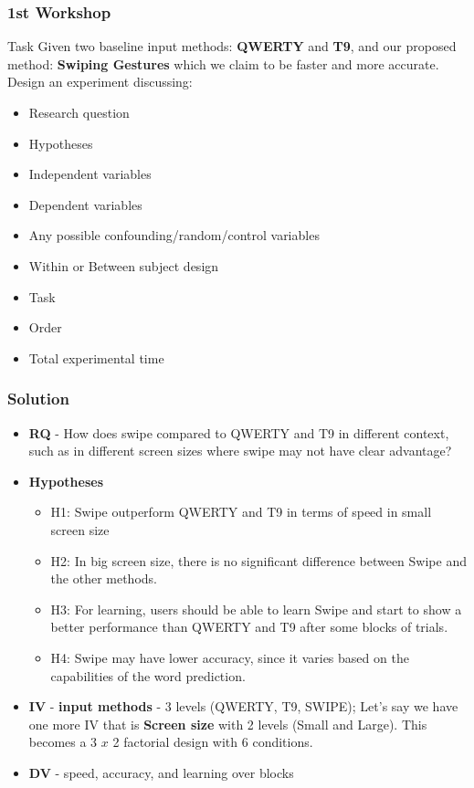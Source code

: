 \documentclass{beamer}
\begin{document}
\begin{frame}
	\frametitle{1st Workshop}
	\footnotesize
	\begin{block}{Task}	
	Given two baseline input methods: \textbf{QWERTY} and \textbf{T9}, and our proposed method: \textbf{Swiping Gestures} which we claim to be faster and more accurate.   Design an experiment discussing:
	\begin{itemize}
	\item Research question
	\item Hypotheses
	\item Independent variables
	\item Dependent variables
	\item Any possible confounding/random/control variables
	\item Within or Between subject design
	\item Task
	\item Order
	\item Total experimental time
	\end{itemize}
	\end{block}
\end{frame}

\begin{frame}
	\footnotesize
	\frametitle{Solution}
	\begin{itemize}
     \item \textbf{RQ} - How does swipe compared to QWERTY and T9 in different context, such as in different screen sizes where swipe may not have clear advantage?
     \item \textbf{Hypotheses}
     \begin{itemize}
     	\item H1:  Swipe outperform QWERTY and T9 in terms of speed in small screen size
     	\item H2:  In big screen size,  there is no significant difference between Swipe and the other methods.
     	\item H3:  For learning,  users should be able to learn Swipe and start to show a better performance than QWERTY and T9 after some blocks of trials.
     	\item H4:  Swipe may have lower accuracy, since it varies based on the capabilities of the word prediction.
     \end{itemize}
		\item \textbf{IV} - \textbf{input methods} - 3 levels (QWERTY, T9, SWIPE);  Let's say we have one more IV that is \textbf{Screen size} with 2 levels (Small and Large).  This becomes a 3 $x$ 2 factorial design with 6 conditions.
		\item \textbf{DV} - speed, accuracy, and learning over blocks
	\end{itemize}
\end{frame}
\end{document}
